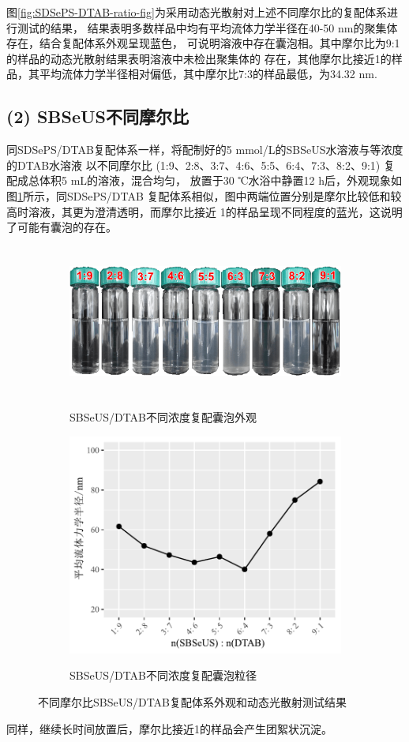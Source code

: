 \documentclass[bachelor,winfonts,replaceperiod]{jnuthesis}
\begin{document}
    图\ref{fig:SDSePS-DTAB-ratio-fig}为采用动态光散射对上述不同摩尔比的复配体系进行测试的结果，
    结果表明多数样品中均有平均流体力学半径在40-50 nm的聚集体存在，结合复配体系外观呈现蓝色，
    可说明溶液中存在囊泡相。其中摩尔比为9:1的样品的动态光散射结果表明溶液中未检出聚集体的
    存在，其他摩尔比接近1的样品，其平均流体力学半径相对偏低，其中摩尔比7:3的样品最低，为34.32 nm.

    \subsection*{(2) SBSeUS不同摩尔比}
    同SDSePS/DTAB复配体系一样，将配制好的5 mmol/L的SBSeUS水溶液与等浓度的DTAB水溶液
    以不同摩尔比 (1:9、2:8、3:7、4:6、5:5、6:4、7:3、8:2、9:1) 复配成总体积5 mL的溶液，混合均匀，
    放置于30 ℃水浴中静置12 h后，外观现象如图\ref{fig:SBSeUS-DTAB-ratio}所示，同SDSePS/DTAB
    复配体系相似，图中两端位置分别是摩尔比较低和较高时溶液，其更为澄清透明，而摩尔比接近
    1的样品呈现不同程度的蓝光，这说明了可能有囊泡的存在。
    \begin{figure}[htbp]
        \centering
        \begin{subfigure}[]{\textwidth}
            \centering
            \includegraphics[height=5cm]{figure/SBSeUS-DTAB-ratio.png}\\
            \caption{SBSeUS/DTAB不同浓度复配囊泡外观}\label{fig:SBSeUS-DTAB-ratio}
        \end{subfigure}%

        \begin{subfigure}[]{\textwidth}
            \centering
            \includegraphics[width=.6\textwidth]{figure/SBSeUS-DTAB-ratio-fig.pdf}\\
            \caption{SBSeUS/DTAB不同浓度复配囊泡粒径}\label{fig:SBSeUS-DTAB-ratio-fig}
        \end{subfigure}%
        \caption{不同摩尔比SBSeUS/DTAB复配体系外观和动态光散射测试结果}
        \label{fig:不同摩尔比SBSeUS/DTAB}
    \end{figure}
    同样，继续长时间放置后，摩尔比接近1的样品会产生团絮状沉淀。
    
\end{document}
